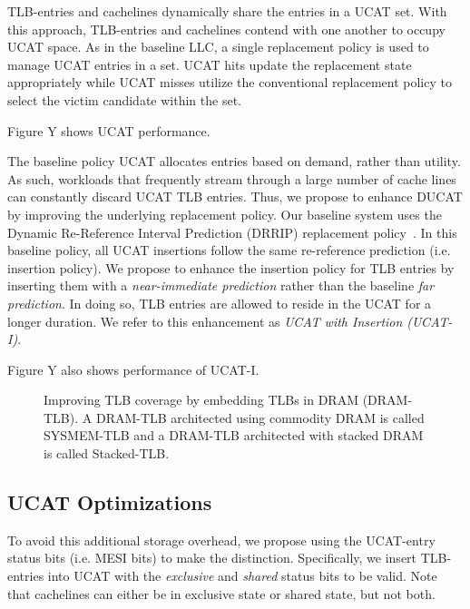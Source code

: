 TLB-entries and cachelines dynamically share the entries in a UCAT
set. With this approach, TLB-entries and cachelines contend with one
another to occupy UCAT space. As in the baseline LLC, a single
replacement policy is used to manage UCAT entries in a set. UCAT hits
update the replacement state appropriately while UCAT misses utilize
the conventional replacement policy to select the victim candidate
within the set.


Figure Y shows UCAT performance.

The baseline policy UCAT allocates entries based on demand, rather than
utility. As such, workloads that frequently stream through a large
number of cache lines can constantly discard UCAT TLB entries. Thus,
we propose to enhance DUCAT by improving the underlying replacement
policy. Our baseline system uses the Dynamic Re-Reference Interval
Prediction (DRRIP) replacement policy~\cite{}. In this baseline
policy, all UCAT insertions follow the same re-reference prediction
(i.e. insertion policy). We propose to enhance the insertion policy
for TLB entries by inserting them with a {\em near-immediate
prediction} rather than the baseline {\em far prediction}. In doing
so, TLB entries are allowed to reside in the UCAT for a longer
duration. We refer to this enhancement as {\em UCAT with Insertion
(UCAT-I)}.

Figure Y also shows performance of UCAT-I.

\begin{figure*}[t] 
  \vspace{-0. in} \centering
   \centerline{}

  \caption{\small Improving TLB coverage by embedding TLBs in DRAM
    (DRAM-TLB). A DRAM-TLB architected using commodity DRAM is called
    SYSMEM-TLB and a DRAM-TLB architected with stacked DRAM is called
    Stacked-TLB. \normalsize}
  \label{fig:stacked_tlb} 
  \vspace{-0. in}
\end{figure*}

\subsection{UCAT Optimizations}

To avoid this additional storage overhead, we propose using the
UCAT-entry status bits (i.e. MESI bits) to make the distinction.
Specifically, we insert TLB-entries into UCAT with the {\em exclusive}
and {\em shared} status bits to be valid. Note that cachelines can
either be in exclusive state or shared state, but not both.

